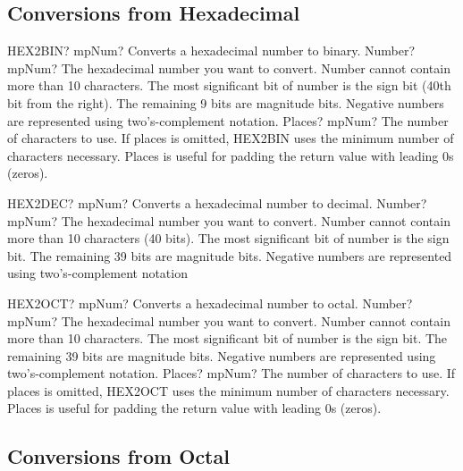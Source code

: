 \subsection{Conversions from Hexadecimal}


\begin{mpFunctionsExtract}
	\mpWorksheetFunctionTwoNotImplemented
	{HEX2BIN? mpNum? Converts a  hexadecimal number to binary.}
	{Number? mpNum? The hexadecimal number you want to convert. Number cannot contain more than 10 characters. The most significant bit of number is the sign bit (40th bit from the right). The remaining 9 bits are magnitude bits. Negative numbers are represented using two's-complement notation.}
	{Places? mpNum? The number of characters to use. If places is omitted, HEX2BIN uses the minimum number of characters necessary. Places is useful for padding the return value with leading 0s (zeros).}
\end{mpFunctionsExtract}


\vspace{0.6cm}
\begin{mpFunctionsExtract}
	\mpWorksheetFunctionOneNotImplemented
	{HEX2DEC? mpNum? Converts a hexadecimal number to decimal.}
	{Number? mpNum? The hexadecimal number you want to convert. Number cannot contain more than 10 characters (40 bits). The most significant bit of number is the sign bit. The remaining 39 bits are magnitude bits. Negative numbers are represented using two's-complement notation}
\end{mpFunctionsExtract}


\vspace{0.6cm}
\begin{mpFunctionsExtract}
	\mpWorksheetFunctionTwoNotImplemented
	{HEX2OCT? mpNum? Converts a hexadecimal number to octal.}
	{Number? mpNum? The hexadecimal number you want to convert. Number cannot contain more than 10 characters. The most significant bit of number is the sign bit. The remaining 39 bits are magnitude bits. Negative numbers are represented using two's-complement notation.}
	{Places? mpNum? The number of characters to use. If places is omitted, HEX2OCT uses the minimum number of characters necessary. Places is useful for padding the return value with leading 0s (zeros).}
\end{mpFunctionsExtract}





\subsection{Conversions from Octal}

